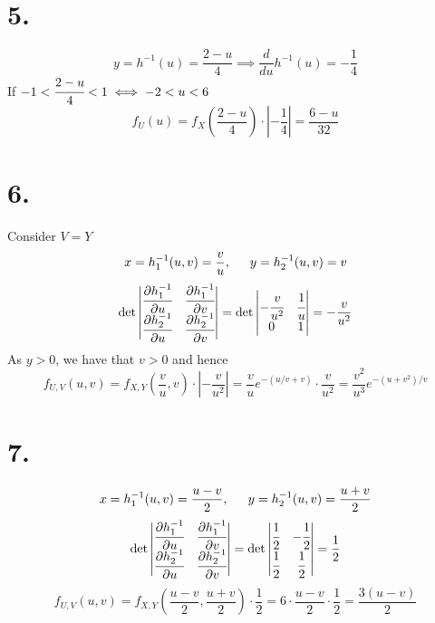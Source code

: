 \documentclass[11pt]{article}
\begin{document}
\section*{5.}
\[
    y = h^{-1}(u) = \frac{2-u}{4} \implies \frac{d}{du}h^{-1}(u) = -\frac{1}{4}    
\]
If $-1<\cfrac{2-u}{4}< 1 \iff -2<u<6$
\[
    f_U(u) = f_X\left(\frac{2-u}{4}\right) \cdot \left|-\frac{1}{4}\right| = \frac{6-u}{32} 
\]
\pagebreak
\section*{6.}
Consider $V=Y$
\[
    x = h_1^{-1}(u,v) = \frac{v}{u}, \indent  y = h_2^{-1}(u,v) = v
\]
\[
    \det 
    \begin{vmatrix}
        \cfrac{\partial h_1^{-1}}{\partial u} & \cfrac{\partial h_1^{-1}}{\partial v} \\
        \cfrac{\partial h_2^{-1}}{\partial u} & \cfrac{\partial h_2^{-1}}{\partial v}
    \end{vmatrix}    
    = 
    \det 
    \begin{vmatrix}
        -\cfrac{v}{u^2} & \cfrac{1}{u} \\
        0 & 1 
    \end{vmatrix}
    = -\frac{v}{u^2}
\]
As $y>0$, we have that $v>0$ and hence 
\[
    f_{U,V}(u,v) = f_{X,Y}\left(\frac{v}{u}, v\right) \cdot \left| -\frac{v}{u^2} \right| =  
    \frac{v}{u} e^{-(u/v + v)} \cdot \frac{v}{u^2} = \frac{v^2}{u^3}e^{-(u+v^2)/v} 
\]
\pagebreak
\section*{7.}
\[
    x = h_1^{-1}(u,v) = \frac{u-v}{2}, \indent y = h_2^{-1}(u,v) = \frac{u+v}{2}    
\]
\[
    \det 
    \begin{vmatrix}
        \cfrac{\partial h_1^{-1}}{\partial u} & \cfrac{\partial h_1^{-1}}{\partial v} \\
        \cfrac{\partial h_2^{-1}}{\partial u} & \cfrac{\partial h_2^{-1}}{\partial v}
    \end{vmatrix}    
    = 
    \det 
    \begin{vmatrix}
        \cfrac{1}{2} & -\cfrac{1}{2} \\
        \cfrac{1}{2} & \cfrac{1}{2} 
    \end{vmatrix}
    = \frac{1}{2}
\]
\[
    f_{U,V}(u,v) = f_{X,Y}\left( \frac{u-v}{2}, \frac{u+v}{2}\right) \cdot \frac{1}{2} 
    = 6 \cdot \frac{u-v}{2} \cdot \frac{1}{2} = \frac{3(u-v)}{2}     
\]
\end{document}
